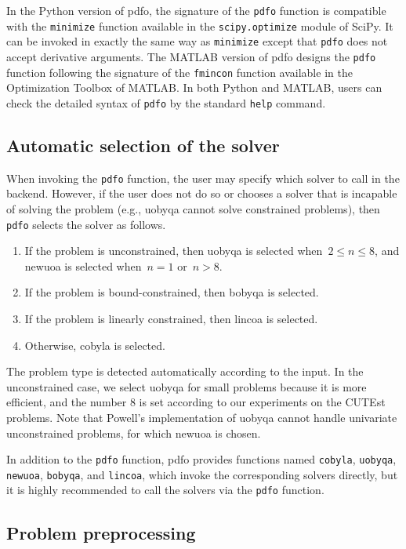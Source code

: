 \documentclass[manuscript,screen,review]{acmart}
\numberwithin{equation}{section}
\newcommand*{\bobyqafun}{\texttt{bobyqa}\xspace}
\newcommand*{\cobylafun}{\texttt{cobyla}\xspace}
\newcommand*{\lincoafun}{\texttt{lincoa}\xspace}
\newcommand*{\newuoafun}{\texttt{newuoa}\xspace}
\newcommand*{\pdfofun}{\texttt{pdfo}\xspace}
\newcommand*{\uobyqafun}{\texttt{uobyqa}\xspace}
\begin{document}
In the Python version of \gls{pdfo}, the signature of the \pdfofun function is compatible with the \texttt{minimize} function available in the \texttt{scipy.optimize} module of SciPy.
It can be invoked in exactly the same way as \texttt{minimize} except that \pdfofun does not accept derivative arguments.
The MATLAB version of \gls{pdfo} designs the \pdfofun function following the signature of the \texttt{fmincon} function available in the Optimization Toolbox of MATLAB.
In both Python and MATLAB, users can check the detailed syntax of \pdfofun by the standard \texttt{help} command.

\subsection{Automatic selection of the solver}
\label{subsec:solver-selection}

When invoking the \pdfofun function, the user may specify which solver to call in the backend.
However, if the user does not do so or chooses a solver that is incapable of solving the problem (e.g., \gls{uobyqa} cannot solve constrained problems), then \pdfofun selects the solver as follows.
\begin{enumerate}
    \item If the problem is unconstrained, then \gls{uobyqa} is selected when~$2 \le n \le 8$, and \gls{newuoa} is selected when~$n = 1$ or~$n > 8$.
    \item If the problem is bound-constrained, then \gls{bobyqa} is selected.
    \item If the problem is linearly constrained, then \gls{lincoa} is selected.
    \item Otherwise, \gls{cobyla} is selected.
\end{enumerate}
The problem type is detected automatically according to the input.
In the unconstrained case, we select \gls{uobyqa} for small problems because it is more efficient, and the number \num{8} is set according to our experiments on the CUTEst~\cite{Gould_Orban_Toint_2015} problems.
Note that Powell's implementation of \gls{uobyqa} cannot handle univariate unconstrained problems, for which \gls{newuoa} is chosen.

In addition to the \pdfofun function, \gls{pdfo} provides functions named \cobylafun, \uobyqafun, \newuoafun, \bobyqafun, and \lincoafun, which invoke the corresponding solvers directly, but it is highly recommended to call the solvers via the \pdfofun function.

\subsection{Problem preprocessing}
\label{subsec:pdfo-preprocessing}
\end{document}
